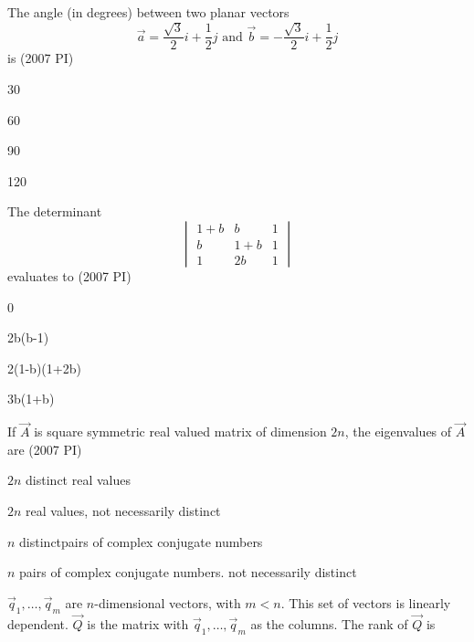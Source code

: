     \item 
    The angle (in degrees) between two planar vectors 
$$\vec{a} = \frac{\sqrt{3}}{2} i + \frac{1}{2}  j
\text{ and } \vec{b} = -\frac{\sqrt{3}}{2}  i + \frac{1}{2}  j$$
      is
      \hfill(2007 PI)
      \begin{enumerate}
      \begin{multicols}{4}
          \item 30
          \item 60
          \item 90
          \item 120
          \end{multicols}
      \end{enumerate}
    \item 
    The determinant
$$
\begin{vmatrix}
1+b & b & 1 \\
b & 1+b & 1 \\
1 & 2b & 1
\end{vmatrix}
$$
evaluates to
\hfill(2007 PI)
\begin{enumerate}
\begin{multicols}{4}
    \item 0
    \item 2b(b-1)
    \item 2(1-b)(1+2b)
    \item 3b(1+b)
    \end{multicols}
\end{enumerate}
            \item
           	If $\vec{A}$ is square symmetric real valued matrix of dimension $2n$, the eigenvalues of $\vec{A}$ are
            \hfill(2007 PI)
            \begin{enumerate}
            \begin{multicols}{2}
                \item $2n$ distinct real values 
                \item 	$2n$ real values, not necessarily distinct
                \item 	$n$ distinctpairs of complex conjugate numbers
                \item $n$ pairs of complex conjugate numbers. not necessarily distinct
                \end{multicols}
            \end{enumerate}
\item
$\vec{q}_{1},\dots, \vec{q}_{m}$ are $n$-dimensional vectors, with $m < n$. This set of vectors is linearly dependent. $\vec{Q}$ is the matrix with $\vec{q}_{1},\dots, \vec{q}_{m}$ as the columns. The rank of $\vec{Q}$ is

